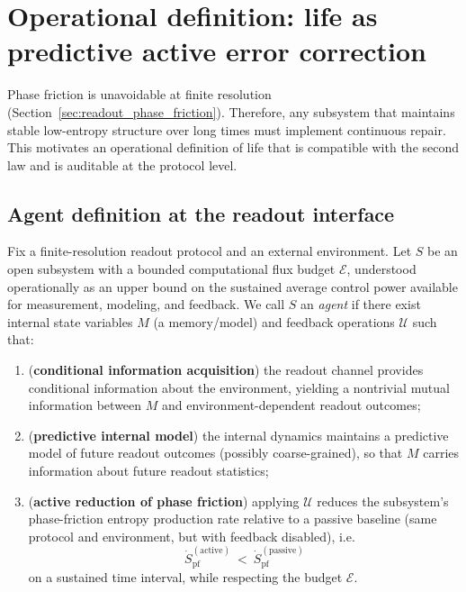 \section{Operational definition: life as predictive active error correction}
\label{sec:life_aec}

Phase friction is unavoidable at finite resolution (Section~\ref{sec:readout_phase_friction}).
Therefore, any subsystem that maintains stable low-entropy structure over long times must implement continuous repair.
This motivates an operational definition of life that is compatible with the second law and is auditable at the protocol level.

\subsection{Agent definition at the readout interface}
\label{sec:agent_definition}

\begin{definition}
\label{def:agent_aec}
Fix a finite-resolution readout protocol and an external environment.
Let $S$ be an open subsystem with a bounded computational flux budget $\mathcal{E}$, understood operationally as an upper bound on the sustained average control power available for measurement, modeling, and feedback.
We call $S$ an \emph{agent} if there exist internal state variables $M$ (a memory/model) and feedback operations $\mathcal{U}$ such that:
\begin{enumerate}
  \item (\textbf{conditional information acquisition}) the readout channel provides conditional information about the environment, yielding a nontrivial mutual information between $M$ and environment-dependent readout outcomes;
  \item (\textbf{predictive internal model}) the internal dynamics maintains a predictive model of future readout outcomes (possibly coarse-grained), so that $M$ carries information about future readout statistics;
  \item (\textbf{active reduction of phase friction}) applying $\mathcal{U}$ reduces the subsystem's phase-friction entropy production rate relative to a passive baseline (same protocol and environment, but with feedback disabled), i.e.
  \begin{equation}
    \dot S_{\mathrm{pf}}^{\mathrm{(active)}}\ <\ \dot S_{\mathrm{pf}}^{\mathrm{(passive)}}
  \end{equation}
  on a sustained time interval, while respecting the budget $\mathcal{E}$.
\end{enumerate}
\end{definition}

